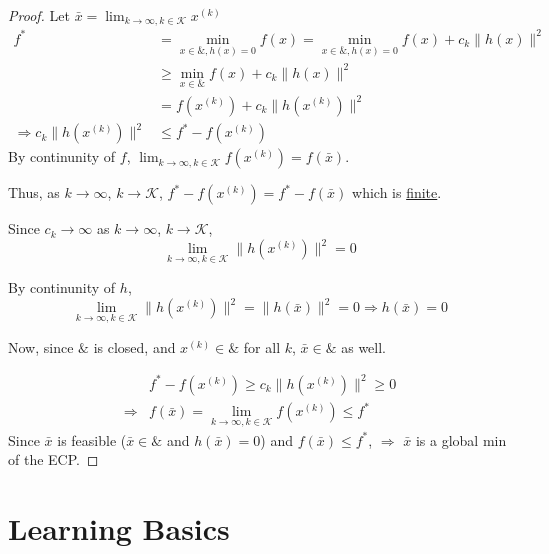 \documentclass[11pt,a4paper]{article}
\begin{document}
\begin{proof}
    Let $\bar{x}=\lim_{k \rightarrow \infty, k\in \mathcal{K}}x^{(k)}$
    \begin{equation}
        \begin{aligned}
            f^*&=\min_{x\in\&,h(x)=0}f(x)=\min_{x\in\&,h(x)=0}f(x)+c_k\|h(x)\|^2\\
            &\geq \min_{x\in\&}f(x)+c_k\|h(x)\|^2\\
            &=f(x^{(k)})+c_k\|h(x^{(k)})\|^2\\
            \Rightarrow	c_k\|h(x^{(k)})\|^2&\leq f^*-f(x^{(k)})
        \end{aligned}
        \nonumber
    \end{equation}
    By continunity of $f$, $\lim_{k \rightarrow \infty, k\in \mathcal{K}}f(x^{(k)})=f(\bar{x})$.

    Thus, as $k \rightarrow	\infty$, $k \rightarrow	\mathcal{K}$, $f^*-f(x^{(k)})=f^*-f(\bar{x})$ which is \underline{finite}.

    Since $c_k \rightarrow \infty$ as $k \rightarrow	\infty$, $k \rightarrow	\mathcal{K}$, $$\lim_{k \rightarrow \infty, k\in \mathcal{K}}\|h(x^{(k)})\|^2=0$$

    By continunity of $h$,
    $$\lim_{k \rightarrow \infty, k\in \mathcal{K}}\|h(x^{(k)})\|^2=\|h(\bar{x})\|^2=0 \Rightarrow	h(\bar{x})=0$$

    Now, since $\&$ is closed, and $x^{(k)}\in \&$ for all $k$, $\bar{x}\in\&$ as well.

    \begin{equation}
        \begin{aligned}
            &f^*-f(x^{(k)})\geq c_k\|h(x^{(k)})\|^2\geq 0\\
            \Rightarrow	& f(\bar{x})=\lim_{k \rightarrow \infty, k\in \mathcal{K}}f(x^{(k)})\leq f^*
        \end{aligned}
        \nonumber
    \end{equation}
    Since $\bar{x}$ is feasible ($\bar{x}\in\&$ and $h(\bar{x})=0$) and $f(\bar{x})\leq f^*$, $\Rightarrow$ $\bar{x}$ is a global min of the ECP.
\end{proof}











\section{Learning Basics}
\end{document}
